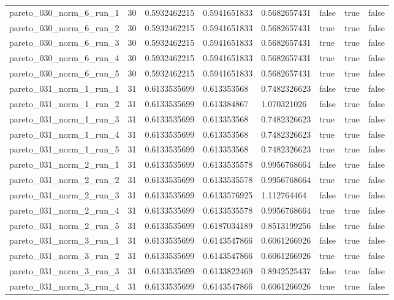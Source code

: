 \begin{tabular}{@{}llllllll@{}}
pareto\_030\_norm\_6\_run\_1 & 30 & 0.5932462215 & 0.5941651833 & 0.5682657431 & false & true & false \\
pareto\_030\_norm\_6\_run\_2 & 30 & 0.5932462215 & 0.5941651833 & 0.5682657431 & true & true & false \\
pareto\_030\_norm\_6\_run\_3 & 30 & 0.5932462215 & 0.5941651833 & 0.5682657431 & true & true & false \\
pareto\_030\_norm\_6\_run\_4 & 30 & 0.5932462215 & 0.5941651833 & 0.5682657431 & true & true & false \\
pareto\_030\_norm\_6\_run\_5 & 30 & 0.5932462215 & 0.5941651833 & 0.5682657431 & true & true & false \\
pareto\_031\_norm\_1\_run\_1 & 31 & 0.6133535699 & 0.613353568 & 0.7482326623 & false & true & false \\
pareto\_031\_norm\_1\_run\_2 & 31 & 0.6133535699 & 0.613384867 & 1.070321026 & false & true & false \\
pareto\_031\_norm\_1\_run\_3 & 31 & 0.6133535699 & 0.613353568 & 0.7482326623 & true & true & false \\
pareto\_031\_norm\_1\_run\_4 & 31 & 0.6133535699 & 0.613353568 & 0.7482326623 & true & true & false \\
pareto\_031\_norm\_1\_run\_5 & 31 & 0.6133535699 & 0.613353568 & 0.7482326623 & true & true & false \\
pareto\_031\_norm\_2\_run\_1 & 31 & 0.6133535699 & 0.6133535578 & 0.9956768664 & false & true & false \\
pareto\_031\_norm\_2\_run\_2 & 31 & 0.6133535699 & 0.6133535578 & 0.9956768664 & true & true & false \\
pareto\_031\_norm\_2\_run\_3 & 31 & 0.6133535699 & 0.6133576925 & 1.112764464 & false & true & false \\
pareto\_031\_norm\_2\_run\_4 & 31 & 0.6133535699 & 0.6133535578 & 0.9956768664 & true & true & false \\
pareto\_031\_norm\_2\_run\_5 & 31 & 0.6133535699 & 0.6187034189 & 0.8513199256 & false & true & false \\
pareto\_031\_norm\_3\_run\_1 & 31 & 0.6133535699 & 0.6143547866 & 0.6061266926 & false & true & false \\
pareto\_031\_norm\_3\_run\_2 & 31 & 0.6133535699 & 0.6143547866 & 0.6061266926 & true & true & false \\
pareto\_031\_norm\_3\_run\_3 & 31 & 0.6133535699 & 0.6133822469 & 0.8942525437 & false & true & false \\
pareto\_031\_norm\_3\_run\_4 & 31 & 0.6133535699 & 0.6143547866 & 0.6061266926 & true & true & false \\

\end{tabular}

